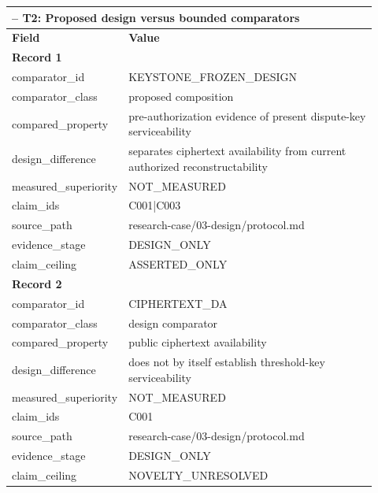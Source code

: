 \begingroup
\setlength{\tabcolsep}{2pt}
\small\sloppy
\begin{longtable}{|p{0.24\linewidth}|p{0.68\linewidth}|}
\hline
\multicolumn{2}{|l|}{\KeystoneDraftTableNotice{} -- T2: Proposed design versus bounded comparators} \\ \hline
\textbf{Field} & \textbf{Value} \\ \hline
\multicolumn{2}{|l|}{\textbf{Record 1}} \\ \hline
comparator\_\allowbreak{}id & KEYSTONE\_\allowbreak{}FROZEN\_\allowbreak{}DESIGN \\ \hline
comparator\_\allowbreak{}class & proposed composition \\ \hline
compared\_\allowbreak{}property & pre-authorization evidence of present dispute-key serviceability \\ \hline
design\_\allowbreak{}difference & separates ciphertext availability from current authorized reconstructability \\ \hline
measured\_\allowbreak{}superiority & NOT\_\allowbreak{}MEASURED \\ \hline
claim\_\allowbreak{}ids & C001|C003 \\ \hline
source\_\allowbreak{}path & research-case/03-design/protocol.md \\ \hline
evidence\_\allowbreak{}stage & DESIGN\_\allowbreak{}ONLY \\ \hline
claim\_\allowbreak{}ceiling & ASSERTED\_\allowbreak{}ONLY \\ \hline
\multicolumn{2}{|l|}{\textbf{Record 2}} \\ \hline
comparator\_\allowbreak{}id & CIPHERTEXT\_\allowbreak{}DA \\ \hline
comparator\_\allowbreak{}class & design comparator \\ \hline
compared\_\allowbreak{}property & public ciphertext availability \\ \hline
design\_\allowbreak{}difference & does not by itself establish threshold-key serviceability \\ \hline
measured\_\allowbreak{}superiority & NOT\_\allowbreak{}MEASURED \\ \hline
claim\_\allowbreak{}ids & C001 \\ \hline
source\_\allowbreak{}path & research-case/03-design/protocol.md \\ \hline
evidence\_\allowbreak{}stage & DESIGN\_\allowbreak{}ONLY \\ \hline
claim\_\allowbreak{}ceiling & NOVELTY\_\allowbreak{}UNRESOLVED \\ \hline

\end{longtable}
